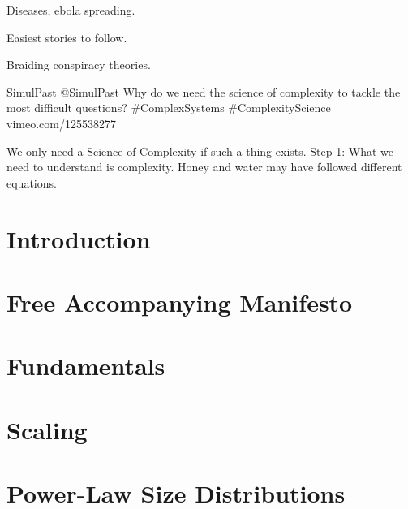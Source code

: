 Diseases, ebola spreading.

Easiest stories to follow.

Braiding conspiracy theories.


SimulPast @SimulPast
Why do we need the science of complexity to tackle the most difficult
questions?  
\#ComplexSystems \#ComplexityScience vimeo.com/125538277

We only need a Science of Complexity if such a thing exists.
Step 1: What we need to understand is complexity.
Honey and water may have followed different equations.

\cleartoleftpage
{}
\chapter{Introduction}
\label{ch:pocsbook.introduction}



\cleartoleftpage
{}
\chapter{Free Accompanying Manifesto}
\label{ch:pocsbook.introduction}



\cleartoleftpage
{}
\chapter{Fundamentals}
\label{ch:pocsbook.fundamentals}


\cleartoleftpage
{}
\chapter{Scaling}
\label{ch:pocsbook.scaling}



\cleartoleftpage
{}
\chapter{Power-Law Size Distributions}
\label{ch:pocsbook.powerlawsizedistributions}

